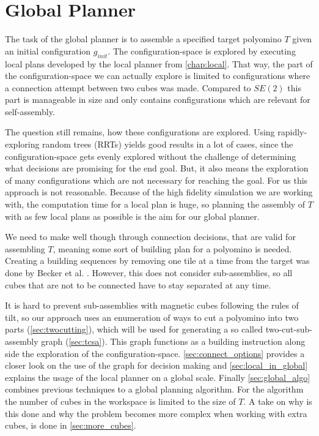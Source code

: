 \chapter{Global Planner}
\label{chap:global}

The task of the global planner is to assemble a specified target polyomino $T$ given an initial configuration $g_{init}$.
The configuration-space is explored by executing local plans developed by the local planner from \autoref{chap:local}.
That way, the part of the configuration-space we can actually explore is limited to configurations where a connection attempt between two cubes was made.
Compared to $SE(2)$ this part is manageable in size and only contains configurations which are relevant for self-assembly.

The question still remains, how these configurations are explored.
Using rapidly-exploring random trees (RRTs) \cite{lavalle1998} yields good results in a lot of cases, since the configuration-space gets evenly explored without the challenge of determining what decisions are promising for the end goal.
But, it also means the exploration of many configurations which are not necessary for reaching the goal.
For us this approach is not reasonable. 
Because of the high fidelity simulation we are working with, the computation time for a local plan is huge, so planning the assembly of $T$ with as few local plans as possible is the aim for our global planner.

We need to make well though through connection decisions, that are valid for assembling $T$, meaning some sort of building plan for a polyomino is needed.
Creating a building sequences by removing one tile at a time from the target was done by Becker et al. \cite{Becker2020}.
However, this does not consider sub-assemblies, so all cubes that are not to be connected have to stay separated at any time.

It is hard to prevent sub-assemblies with magnetic cubes following the rules of tilt, so our approach uses an enumeration of ways to cut a polyomino into two parts (\autoref{sec:twocutting}), which will be used for generating a so called two-cut-sub-assembly graph (\autoref{sec:tcsa}).
This graph functions as a building instruction along side the exploration of the configuration-space.
\autoref{sec:connect_options} provides a closer look on the use of the graph for decision making and \autoref{sec:local_in_global} explains the usage of the local planner on a global scale. 
Finally \autoref{sec:global_algo} combines previous techniques to a global planning algorithm.
For the algorithm the number of cubes in the workspace is limited to the size of $T$.
A take on why is this done and why the problem becomes more complex when working with extra cubes, is done in \autoref{sec:more_cubes}.


